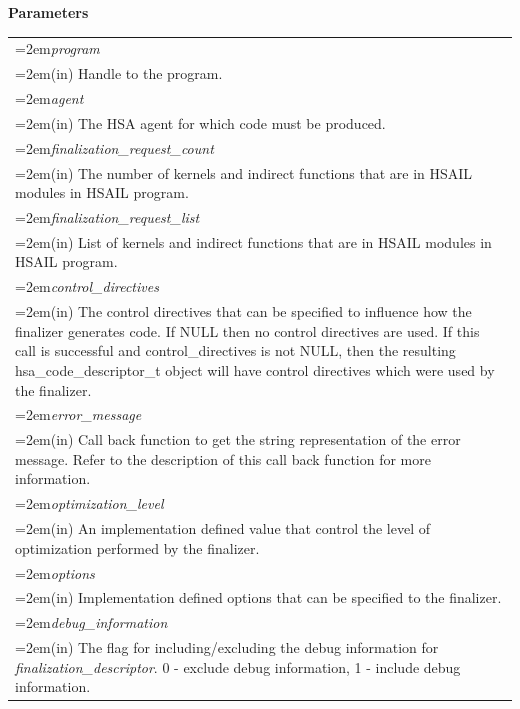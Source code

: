 \documentclass[final]{book}
\newcommand{\hsaarg}[1]{\textit{#1}}
\begin{document}
\begin{appendices}
\noindent\textbf{Parameters}\\[-6mm]
\noindent\begin{longtable}{@{}>{\hangindent=2em}p{\textwidth}}
\hsaarg{program}\\\hspace{2em}(in) Handle to the program.\\[2mm]
\hsaarg{agent}\\\hspace{2em}(in) The HSA agent for which code must be produced.\\[2mm]
\hsaarg{finalization_request_count}\\\hspace{2em}(in) The number of kernels and indirect functions that are in HSAIL modules in HSAIL program.\\[2mm]
\hsaarg{finalization_request_list}\\\hspace{2em}(in) List of kernels and indirect functions that are in HSAIL modules in HSAIL program.\\[2mm]
\hsaarg{control_directives}\\\hspace{2em}(in) The control directives that can be specified to influence how the finalizer generates code. If NULL then no control directives are used. If this call is successful and control_directives is not NULL, then the resulting hsa_code_descriptor_t object will have control directives which were used by the finalizer.\\[2mm]
\hsaarg{error_message}\\\hspace{2em}(in) Call back function to get the string representation of the error message. Refer to the description of this call back function for more information.\\[2mm]
\hsaarg{optimization_level}\\\hspace{2em}(in) An implementation defined value that control the level of optimization performed by the finalizer.\\[2mm]
\hsaarg{options}\\\hspace{2em}(in) Implementation defined options that can be specified to the finalizer.\\[2mm]
\hsaarg{debug_information}\\\hspace{2em}(in) The flag for including/excluding the debug information for \textit{finalization_descriptor}. 0 - exclude debug information, 1 - include debug information.

\end{longtable}
\end{appendices}
\end{document}
